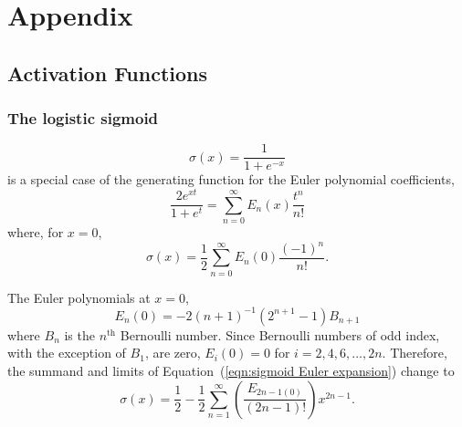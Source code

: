 \section{Appendix}\label{sec:appendix}

\subsection{Activation Functions}
\subsubsection{The logistic sigmoid}
\begin{equation}
	\sigma(x) = \frac{1}{1 + e^{-x}}
	\label{eqn:sigmoid}
\end{equation}
is a special case of the generating function for the Euler polynomial coefficients,
\begin{equation}
	\frac{2e^{x t}}{1 + e^t} = \sum_{n=0}^\infty E_n(x) \frac{t^n}{n!}
\end{equation}
where, for $x = 0$,
\begin{equation}
	\sigma(x) = \frac{1}{2} \sum_{n=0}^\infty E_n(0) \frac{(-1)^n}{n!}.
	\label{eqn:sigmoid Euler expansion}
\end{equation}

The Euler polynomials at $x=0$,
\begin{equation}
	E_n(0) = -2(n+1)^{-1} \left( 2^{n+1} - 1 \right) B_{n+1}
\end{equation}
where $B_n$ is the $n^\textrm{th}$ Bernoulli number. Since Bernoulli numbers of odd index, with the exception of $B_1$, are zero, $E_i(0) = 0$ for $i = 2, 4, 6, \ldots, 2n$. Therefore, the summand and limits of Equation~(\ref{eqn:sigmoid Euler expansion}) change to
\begin{equation}
	\sigma(x) = \frac{1}{2} - \frac{1}{2} \sum_{n=1}^\infty \left( \frac{E_{2n-1(0)}}{(2n-1)!} \right) x^{2n-1}.
\end{equation}

